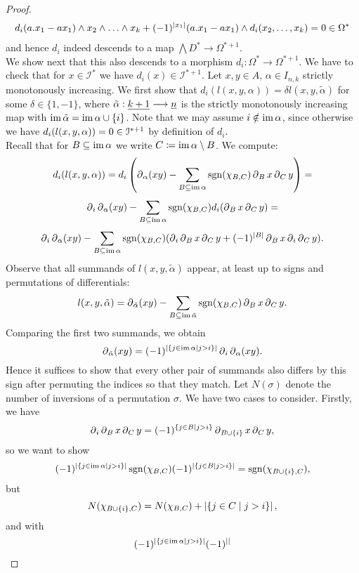 \begin{prop}
\begin{proof}
\begin{gather*}
  d_i (a.x_1 - a x_1) \wedge x_2 \wedge \ldots \wedge x_k + (-1)^{\abs{x_1}} (a.x_1 - a x_1) \wedge d_i (x_2, \ldots , x_k) = 0 \in \Omega^* %
\end{gather*}
and hence $d_i$ indeed descends to a map $\bigwedge D ^* \to \Omega ^ {*+1}$.
\\
We show next that this also descends to a morphism $d_i: \Omega^* \to \Omega^{*+1}$. We have to check that for $x \in \mathcal{I}^*$ we have $d_i(x) \in \mathcal{I}^{*+1}$. Let $x,y \in A$, $\alpha \in I_{n,k}$ strictly monotonously increasing. We first show that $d_i ( l(x,y,\alpha) ) = \delta l(x,y,\tilde \alpha)$ for some $\delta \in \{1,-1\}$, where $\tilde \alpha: \underline{k+1} \longrightarrow \underline{n}$ is the strictly monotonously increasing map with $\operatorname{im} \tilde \alpha = \operatorname{im} \alpha \cup \{i\}$. Note that we may assume $i \notin \operatorname{im} \alpha$, since otherwise we have $d_i ( l(x,y,\alpha) ) = 0 \in \mathcal{I}^{*+1}$ by definition of $d_i$.\\
Recall that for $B \subseteq \operatorname{im} \alpha$ we write $C \coloneqq \operatorname{im} \alpha \setminus B$. We compute:
    \[ d_i ( l(x,y,\alpha) ) =  d_i \left( \del_\alpha (xy) - \sum\limits_{B \subset%
    \im \alpha} \sgn(\chi_{B,C}) \del_B x \del_C y \right) = \]%
    \[ \del_i \del_\alpha (xy) - \sum\limits_{B \subseteq \im \alpha} \sgn(\chi_{B,C})%
    d_i ( \del_B x \del_C y ) = \]%
    \[ \del_i \del_\alpha (xy) - \sum\limits_{B \subseteq \im \alpha} \sgn(\chi_{B,C})%
    ( \del_i \del_B x \del_C y + (-1)^{\abs{B}} \del_B x \del_i \del_C y ). \]
Observe that all summands of $l(x,y,\tilde \alpha)$ appear, at least up to signs and permutations of differentials:
    \[ l(x,y,\tilde \alpha) = \del_{\tilde \alpha} (xy) - \sum_{B \subseteq \im \tilde \alpha} \sgn (\chi_{B,C})%
    \del_B x \del_C y. \]
Comparing the first two summands, we obtain
    \[ \del_{\tilde \alpha} (xy) = %
    (-1)^{\abs{\{ j \in \im \alpha \with j > i \}} } \del_i\del_\alpha (xy). \]
Hence it suffices to show that every other pair of summands also differs by this sign after permuting the indices so that they match. Let $N(\sigma)$ denote the number of inversions of a permutation $\sigma$. We have two cases to consider. Firstly, we have
    \[ \del_i \del_B x \del_C y = %
    (-1)^{ \{j \in B \with j > i\} } \del_{ B \cup \{i\} } x \del_C y,\]
so we want to show%
    \[ (-1)^{\abs{\{ j \in \im \alpha \with j > i \}} } \sgn(\chi_{B,C}) %
    (-1)^{\abs{\{ j \in B \with j > i \}} } = \sgn(\chi_{B \cup \{i\},C}),\]%
but
    \[ N(\chi_{B \cup \{i\},C}) = N(\chi_{B,C}) + %
    \abs{ \{ j \in C \with j > i\} }, \]%
and with%
    \[(-1)^{\abs{\{ j \in \im \alpha \with j > i \}} }  (-1)^{ \abs{ %
}}\]
\end{proof}
\end{prop}
